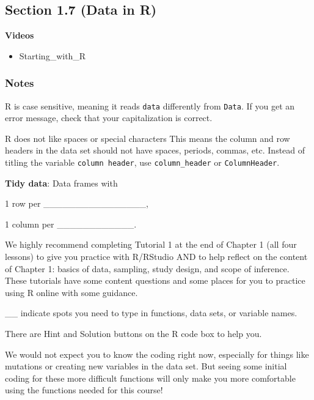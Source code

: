 \documentclass[
]{report}
\providecommand{\tightlist}{%
  \setlength{\itemsep}{0pt}\setlength{\parskip}{0pt}}
\newcommand{\rgi}{\hspace{24pt}}  %
\begin{document}
\hypertarget{section-1.7-data-in-r}{%
\subsection*{Section 1.7 (Data in R)}\label{section-1.7-data-in-r}}

\textbf{Videos}

\begin{itemize}
\tightlist
\item
  Starting\_with\_R
\end{itemize}


\hypertarget{notes-3}{%
\subsubsection*{Notes}\label{notes-3}}

R is case sensitive, meaning it reads \texttt{data} differently from \texttt{Data}. If you get an error message, check that your capitalization is correct.

R does not like spaces or special characters This means the column and row headers in the data set should not have spaces, periods, commas, etc. Instead of titling the variable \texttt{column\ header}, use \texttt{column\_header} or \texttt{ColumnHeader}.

\textbf{Tidy data}: Data frames with

\rgi 1 row per \_\_\_\_\_\_\_\_\_\_\_\_\_\_\_\_,

\rgi 1 column per \_\_\_\_\_\_\_\_\_\_\_\_.

We highly recommend completing Tutorial 1 at the end of Chapter 1 (all four lessons) to give you practice with R/RStudio AND to help reflect on the content of Chapter 1: basics of data, sampling, study design, and scope of inference. These tutorials have some content questions and some places for you to practice using R online with some guidance.

\rgi \_\_ indicate spots you need to type in functions, data sets, or variable names.

\rgi There are Hint and Solution buttons on the R code box to help you.

We would not expect you to know the coding right now, especially for things like mutations or creating new variables in the data set. But seeing some initial coding for these more difficult functions will only make you more comfortable using the functions needed for this course!
\end{document}
